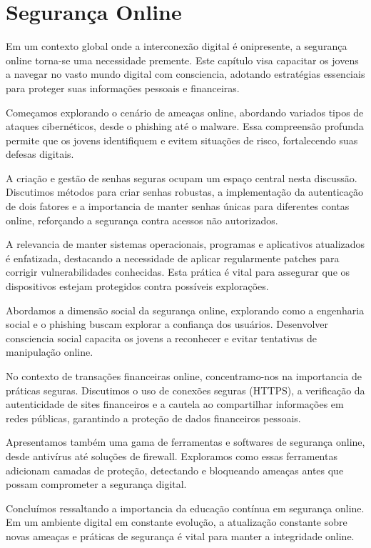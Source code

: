 \documentclass{report}
\begin{document}
\section{Segurança Online}
\label{chap.se}

Em um contexto global onde a interconexão digital é onipresente, a segurança online torna-se uma necessidade premente. Este capítulo visa capacitar os jovens a navegar no vasto mundo digital com consciencia, adotando estratégias essenciais para proteger suas informações pessoais e financeiras.

Começamos explorando o cenário de ameaças online, abordando variados tipos de ataques cibernéticos, desde o phishing até o malware. Essa compreensão profunda permite que os jovens identifiquem e evitem situações de risco, fortalecendo suas defesas digitais.

A criação e gestão de senhas seguras ocupam um espaço central nesta discussão. Discutimos métodos para criar senhas robustas, a implementação da autenticação de dois fatores e a importancia de manter senhas únicas para diferentes contas online, reforçando a segurança contra acessos não autorizados.

A relevancia de manter sistemas operacionais, programas e aplicativos atualizados é enfatizada, destacando a necessidade de aplicar regularmente patches para corrigir vulnerabilidades conhecidas. Esta prática é vital para assegurar que os dispositivos estejam protegidos contra possíveis explorações.

Abordamos a dimensão social da segurança online, explorando como a engenharia social e o phishing buscam explorar a confiança dos usuários. Desenvolver consciencia social capacita os jovens a reconhecer e evitar tentativas de manipulação online.

No contexto de transações financeiras online, concentramo-nos na importancia de práticas seguras. Discutimos o uso de conexões seguras (HTTPS), a verificação da autenticidade de sites financeiros e a cautela ao compartilhar informações em redes públicas, garantindo a proteção de dados financeiros pessoais.

Apresentamos também uma gama de ferramentas e softwares de segurança online, desde antivírus até soluções de firewall. Exploramos como essas ferramentas adicionam camadas de proteção, detectando e bloqueando ameaças antes que possam comprometer a segurança digital.

Concluímos ressaltando a importancia da educação contínua em segurança online. Em um ambiente digital em constante evolução, a atualização constante sobre novas ameaças e práticas de segurança é vital para manter a integridade online.
\end{document}
